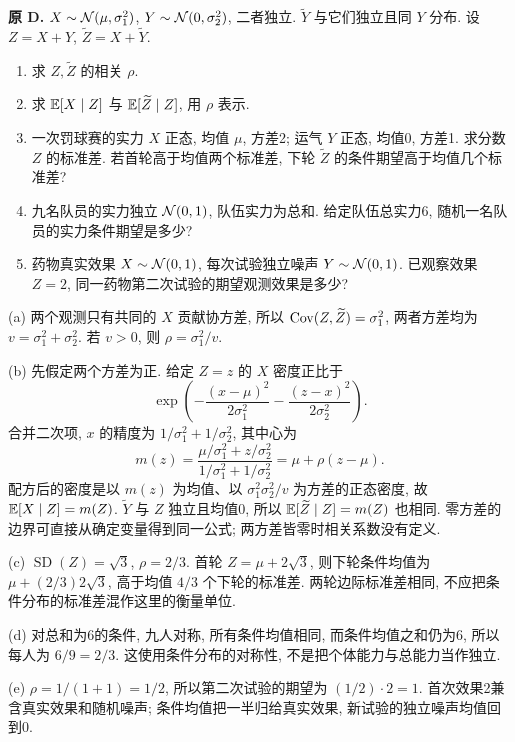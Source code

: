 \begin{exercise}\label{ex:P8.D}
\textbf{原 D.} $X\sim\mathcal N(\mu,\sigma_1^2)$, $Y\sim\mathcal N(0,\sigma_2^2)$, 二者独立. $\widetilde Y$ 与它们独立且同 $Y$ 分布. 设 $Z=X+Y$, $\widetilde Z=X+\widetilde Y$.
\begin{enumerate}[label=(\alph*)]
\item\label{part:P8.D.a} 求 $Z,\widetilde Z$ 的相关 $\rho$.
\item\label{part:P8.D.b} 求 $\mathbb E[X\mid Z]$ 与 $\mathbb E[\widetilde Z\mid Z]$, 用 $\rho$ 表示.
\item\label{part:P8.D.c} 一次罚球赛的实力 $X$ 正态, 均值 $\mu$, 方差2; 运气 $Y$ 正态, 均值0, 方差1. 求分数 $Z$ 的标准差. 若首轮高于均值两个标准差, 下轮 $\widetilde Z$ 的条件期望高于均值几个标准差?
\item\label{part:P8.D.d} 九名队员的实力独立 $\mathcal N(0,1)$, 队伍实力为总和. 给定队伍总实力6, 随机一名队员的实力条件期望是多少?
\item\label{part:P8.D.e} 药物真实效果 $X\sim\mathcal N(0,1)$, 每次试验独立噪声 $Y\sim\mathcal N(0,1)$. 已观察效果 $Z=2$, 同一药物第二次试验的期望观测效果是多少?
\end{enumerate}
\end{exercise}
\begin{solution}\label{sol:P8.D}
(a) 两个观测只有共同的 $X$ 贡献协方差, 所以 $\operatorname{Cov}(Z,\widetilde Z)=\sigma_1^2$, 两者方差均为 $v=\sigma_1^2+\sigma_2^2$. 若 $v>0$, 则 $\rho=\sigma_1^2/v$.

(b) 先假定两个方差为正. 给定 $Z=z$ 的 $X$ 密度正比于
\[
 \exp\left(-\frac{(x-\mu)^2}{2\sigma_1^2}
             -\frac{(z-x)^2}{2\sigma_2^2}\right).
\]
合并二次项, $x$ 的精度为 $1/\sigma_1^2+1/\sigma_2^2$, 其中心为
\[
 m(z)=\frac{\mu/\sigma_1^2+z/\sigma_2^2}
 {1/\sigma_1^2+1/\sigma_2^2}
 =\mu+\rho(z-\mu).
\]
配方后的密度是以 $m(z)$ 为均值、以 $\sigma_1^2\sigma_2^2/v$ 为方差的正态密度, 故 $\mathbb E[X\mid Z]=m(Z)$. $\widetilde Y$ 与 $Z$ 独立且均值0, 所以 $\mathbb E[\widetilde Z\mid Z]=m(Z)$ 也相同. 零方差的边界可直接从确定变量得到同一公式; 两方差皆零时相关系数没有定义.

(c) $\operatorname{SD}(Z)=\sqrt3$, $\rho=2/3$. 首轮 $Z=\mu+2\sqrt3$, 则下轮条件均值为 $\mu+(2/3)2\sqrt3$, 高于均值 $4/3$ 个下轮的标准差. 两轮边际标准差相同, 不应把条件分布的标准差混作这里的衡量单位.

(d) 对总和为6的条件, 九人对称, 所有条件均值相同, 而条件均值之和仍为6, 所以每人为 $6/9=2/3$. 这使用条件分布的对称性, 不是把个体能力与总能力当作独立.

(e) $\rho=1/(1+1)=1/2$, 所以第二次试验的期望为 $(1/2)\cdot2=1$. 首次效果2兼含真实效果和随机噪声; 条件均值把一半归给真实效果, 新试验的独立噪声均值回到0.
\end{solution}

